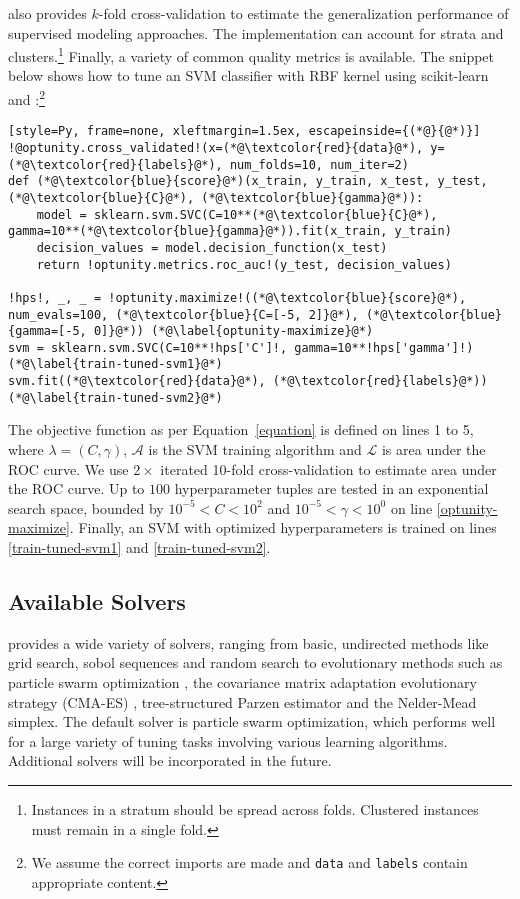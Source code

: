 \optunity also provides $k$-fold cross-validation to estimate the generalization performance of supervised modeling approaches. The implementation can account for strata and clusters.\footnote{Instances in a stratum should be spread across folds. Clustered instances must remain in a single fold.} Finally, a variety of common quality metrics is available. 
The snippet below shows how to tune an SVM classifier with RBF kernel using {\sc scikit-learn} and \optunity:\footnote{We assume the correct imports are made and \texttt{data} and \texttt{labels} contain appropriate content.}


\begin{lstlisting}[style=Py, frame=none, xleftmargin=1.5ex, escapeinside={(*@}{@*)}]
!@optunity.cross_validated!(x=(*@\textcolor{red}{data}@*), y=(*@\textcolor{red}{labels}@*), num_folds=10, num_iter=2)
def (*@\textcolor{blue}{score}@*)(x_train, y_train, x_test, y_test, (*@\textcolor{blue}{C}@*), (*@\textcolor{blue}{gamma}@*)):
    model = sklearn.svm.SVC(C=10**(*@\textcolor{blue}{C}@*), gamma=10**(*@\textcolor{blue}{gamma}@*)).fit(x_train, y_train)
    decision_values = model.decision_function(x_test)
    return !optunity.metrics.roc_auc!(y_test, decision_values)

!hps!, _, _ = !optunity.maximize!((*@\textcolor{blue}{score}@*), num_evals=100, (*@\textcolor{blue}{C=[-5, 2]}@*), (*@\textcolor{blue}{gamma=[-5, 0]}@*)) (*@\label{optunity-maximize}@*)
svm = sklearn.svm.SVC(C=10**!hps['C']!, gamma=10**!hps['gamma']!) (*@\label{train-tuned-svm1}@*)
svm.fit((*@\textcolor{red}{data}@*), (*@\textcolor{red}{labels}@*)) (*@\label{train-tuned-svm2}@*)
\end{lstlisting}

The objective function as per Equation~\eqref{equation} is defined on lines 1 to 5, where $\lambda = (C, \gamma)$, $\mathcal{A}$ is the SVM training algorithm and $\mathcal{L}$ is area under the ROC curve. We use $2\times$ iterated 10-fold cross-validation to estimate area under the ROC curve. Up to $100$ hyperparameter tuples are tested in an exponential search space, bounded by $10^{-5} < C < 10^2$ and $10^{-5} < \gamma < 10^0$ on line \ref{optunity-maximize}. Finally, an SVM with optimized hyperparameters is trained on lines \ref{train-tuned-svm1} and \ref{train-tuned-svm2}.


\subsection{Available Solvers}
\optunity provides a wide variety of solvers, ranging from basic, undirected methods like grid search, sobol sequences and random search \citep{bergstra2012random} to evolutionary methods such as particle swarm optimization \citep{kennedy2010particle}, the covariance matrix adaptation evolutionary strategy (CMA-ES) \citep{hansen2001completely}, tree-structured Parzen estimator \citep{bergstra2011algorithms} and the Nelder-Mead simplex. The default solver is particle swarm optimization, which performs well for a large variety of tuning tasks involving various learning algorithms. Additional solvers will be incorporated in the future.
 
